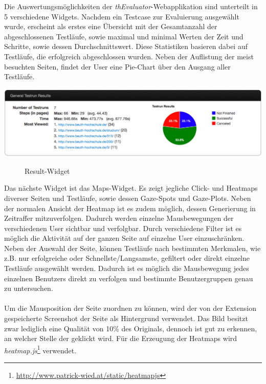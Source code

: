 Die Auswertungsmöglichkeiten der \textit{thEvaluator}-Webapplikation sind unterteilt in 5 verschiedene Widgets. Nachdem ein Testcase zur Evaluierung ausgewählt wurde, erscheint als erstes eine Übersicht mit der Gesamtanzahl der abgeschlossenen Testläufe, sowie maximal und minimal Werten der Zeit und Schritte, sowie dessen Durchschnittswert. Diese Statistiken basieren dabei auf Testläufe, die erfolgreich abgeschlossen wurden. Neben der Auflistung der meist besuchten Seiten, findet der User eine Pie-Chart über den Ausgang aller Testläufe.
\\
\begin{center}
\includegraphics[scale=0.45]{./images/resultWidget}
\end{center}
\begin{figure}[htb]
   \centering
   \caption{Result-Widget}
    \label{resultWidget}
\end{figure}

Das nächste Widget ist das Maps-Widget. Es zeigt jegliche Click- und Heatmaps diverser Seiten und Testläufe, sowie dessen Gaze-Spots und Gaze-Plots. Neben der normalen Ansicht der Heatmap ist es zudem möglich, dessen Generierung in Zeitraffer mitzuverfolgen. Dadurch werden einzelne Mausbewegungen der verschiedenen User sichtbar und verfolgbar. Durch verschiedene Filter ist es möglich die Aktivität auf der ganzen Seite auf einzelne User einzuschränken. Neben der Auswahl der Seite, können Testläufe nach bestimmten Merkmalen, wie z.B. \glqq nur erfolgreiche\grqq{} oder \glqq Schnellste\grqq{}/\glqq Langsamste\grqq{}, gefiltert oder direkt einzelne Testläufe ausgewählt werden. Dadurch ist es möglich die Mausbewegung jedes einzelnen Benutzers direkt zu verfolgen und bestimmte Benutzergruppen genau zu untersuchen.\\
\\
Um die Mausposition der Seite zuordnen zu können, wird der von der Extension gespeicherte Screenshot der Seite als Hintergrund verwendet. Das Bild besitzt zwar lediglich eine Qualität von 10\% des Originals, dennoch ist gut zu erkennen, an welcher Stelle der geklickt wird. Für die Erzeugung der Heatmaps wird \textit{heatmap.js}\footnote{\url{http://www.patrick-wied.at/static/heatmapjs}} verwendet.

